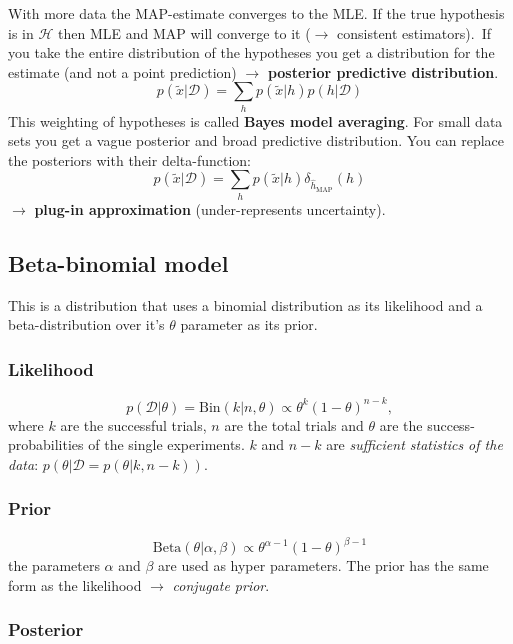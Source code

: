 \documentclass[
]{book}
\begin{document}
With more data the MAP-estimate converges to the MLE. If the true
hypothesis is in \(\mathcal{H}\) then MLE and MAP will converge to it
(\(\rightarrow\) consistent estimators).~If you take the entire
distribution of the hypotheses you get a distribution for the estimate
(and not a point prediction) \(\rightarrow\) \textbf{posterior predictive
distribution}.
\[p(\tilde{x}|\mathcal{D}) = \sum_h p(\tilde{x}|h)p(h|\mathcal{D})\]
This weighting of hypotheses is called \textbf{Bayes model averaging}. For
small data sets you get a vague posterior and broad predictive
distribution. You can replace the posteriors with their delta-function:
\[p(\tilde{x}|\mathcal{D}) = \sum_h p(\tilde{x}|h)\delta_{\hat{h}_{\text{MAP}}}(h)\]
\(\rightarrow\) \textbf{plug-in approximation} (under-represents uncertainty).

\hypertarget{beta-binomial-model}{%
\subsection{Beta-binomial model}\label{beta-binomial-model}}

This is a distribution that uses a binomial distribution as its
likelihood and a beta-distribution over it's \(\theta\) parameter as its
prior.

\hypertarget{likelihood}{%
\subsubsection{Likelihood}\label{likelihood}}

\[p(\mathcal{D}|\theta) = \text{Bin}(k|n, \theta) \propto \theta^k (1-\theta)^{n-k},\]
where \(k\) are the successful trials, \(n\) are the total trials and
\(\theta\) are the success-probabilities of the single experiments. \(k\)
and \(n-k\) are \emph{sufficient statistics of the data}:
\(p(\theta|\mathcal{D} = p(\theta|k, n-k))\).

\hypertarget{prior}{%
\subsubsection{Prior}\label{prior}}

\[\text{Beta}(\theta|\alpha, \beta) \propto \theta^{\alpha-1}(1-\theta)^{\beta-1}\]
the parameters \(\alpha\) and \(\beta\) are used as hyper parameters. The
prior has the same form as the likelihood \(\rightarrow\) \emph{conjugate
prior}.

\hypertarget{posterior}{%
\subsubsection{Posterior}\label{posterior}}
\end{document}
